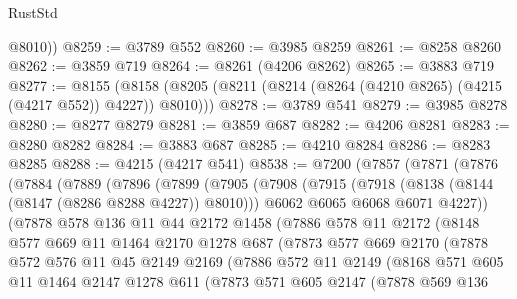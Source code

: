 \begin{lexlean}{RustStd}
\begin{coremodule}
        @8010))
@8259 := @3789 @552
@8260 := @3985 @8259
@8261 := @8258 @8260
@8262 := @3859 @719
@8264 := @8261 (@4206 @8262)
@8265 := @3883 @719
@8277 := @8155
    (@8158 (@8205 (@8211 (@8214 (@8264 (@4210 @8265) (@4215 (@4217 @552)) @4227)) @8010)))
@8278 := @3789 @541
@8279 := @3985 @8278
@8280 := @8277 @8279
@8281 := @3859 @687
@8282 := @4206 @8281
@8283 := @8280 @8282
@8284 := @3883 @687
@8285 := @4210 @8284
@8286 := @8283 @8285
@8288 := @4215 (@4217 @541)
@8538 := @7200
    (@7857
      (@7871
        (@7876
          (@7884
            (@7889
              (@7896
                (@7899
                  (@7905
                    (@7908
                      (@7915
                        (@7918 (@8138 (@8144 (@8147 (@8286 @8288 @4227)) @8010)))
                        @6062
                        @6065
                        @6068
                        @6071
                        @4227))
                    (@7878
                      @578
                      @136
                      @11
                      @44
                      @2172
                      @1458
                      (@7886
                        @578
                        @11
                        @2172
                        (@8148
                          @577
                          @669
                          @11
                          @1464
                          @2170
                          @1278
                          @687
                          (@7873
                            @577
                            @669
                            @2170
                            (@7878
                              @572
                              @576
                              @11
                              @45
                              @2149
                              @2169
                              (@7886
                                @572
                                @11
                                @2149
                                (@8168
                                  @571
                                  @605
                                  @11
                                  @1464
                                  @2147
                                  @1278
                                  @611
                                  (@7873
                                    @571
                                    @605
                                    @2147
                                    (@7878
                                      @569
                                      @136

\end{coremodule}
\end{lexlean}
